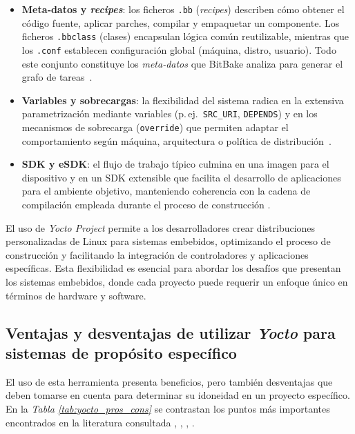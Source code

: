 \begin{itemize}
    \item \textbf{Meta‑datos y \emph{recipes}}: los ficheros \verb|.bb| (\emph{recipes}) describen cómo obtener el código fuente, aplicar parches, compilar y empaquetar un componente.  Los ficheros \verb|.bbclass| (clases) encapsulan lógica común reutilizable, mientras que los \verb|.conf| establecen configuración global (máquina, distro, usuario).  Todo este conjunto constituye los \textit{meta-datos} que BitBake analiza para generar el grafo de tareas \cite{bitbake_manual_2025}.
    
    \item \textbf{Variables y sobrecargas}: la flexibilidad del sistema radica en la extensiva parametrización mediante variables (p.\,ej.\ \texttt{SRC\_URI}, \texttt{DEPENDS}) y en los mecanismos de sobrecarga (\texttt{override}) que permiten adaptar el comportamiento según máquina, arquitectura o política de distribución \cite{bitbake_manual_2025}.  
    \item \textbf{SDK y eSDK}: el flujo de trabajo típico culmina en una imagen para el dispositivo y en un SDK extensible que facilita el desarrollo de aplicaciones para el ambiente objetivo, manteniendo coherencia con la cadena de compilación empleada durante el proceso de construcción \cite{yocto_overview_2025}.  
  \end{itemize}

El uso de \textit{Yocto Project} permite a los desarrolladores crear distribuciones personalizadas de Linux para sistemas embebidos, optimizando el proceso de construcción y facilitando la integración de controladores y aplicaciones específicas. Esta flexibilidad es esencial para abordar los desafíos que presentan los sistemas embebidos, donde cada proyecto puede requerir un enfoque único en términos de hardware y software.

\subsection{Ventajas y desventajas de utilizar \textit{Yocto} para sistemas de propósito específico}
El uso de esta herramienta presenta beneficios, pero también desventajas que deben tomarse en cuenta para determinar su idoneidad en un proyecto específico. En la \textit{Tabla \ref{tab:yocto_pros_cons}} se contrastan los puntos más importantes encontrados en la literatura consultada \cite{streif_2016}, \cite{abbott_2018}, \cite{pera_2022}, \cite{karacali_2024}.


